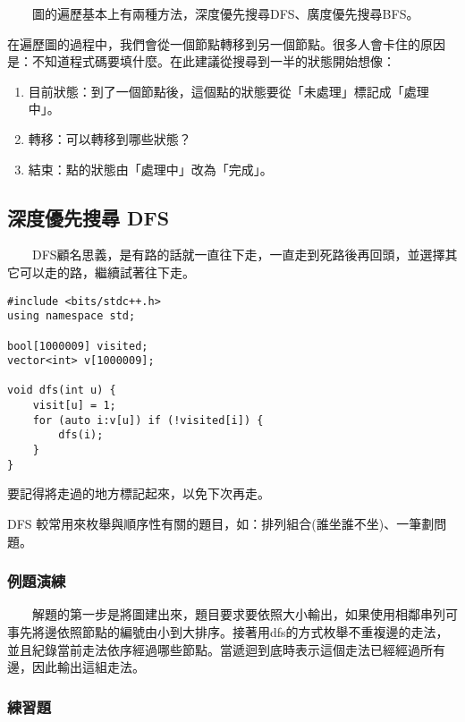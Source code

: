 　　圖的遍歷基本上有兩種方法，深度優先搜尋DFS、廣度優先搜尋BFS。

在遍歷圖的過程中，我們會從一個節點轉移到另一個節點。很多人會卡住的原因是：不知道程式碼要填什麼。在此建議從搜尋到一半的狀態開始想像：

\begin{enumerate}
\item 目前狀態：到了一個節點後，這個點的狀態要從「未處理」標記成「處理中」。
\item 轉移：可以轉移到哪些狀態？
\item 結束：點的狀態由「處理中」改為「完成」。
\end{enumerate}

\subsection{深度優先搜尋 DFS}

　　DFS顧名思義，是有路的話就一直往下走，一直走到死路後再回頭，並選擇其它可以走的路，繼續試著往下走。

\begin{lstlisting}[caption=DFS範例]
#include <bits/stdc++.h>
using namespace std;

bool[1000009] visited;
vector<int> v[1000009];

void dfs(int u) {
	visit[u] = 1;
	for (auto i:v[u]) if (!visited[i]) {
		dfs(i);
	}
}
\end{lstlisting}

要記得將走過的地方標記起來，以免下次再走。

DFS 較常用來枚舉與順序性有關的題目，如：排列組合(誰坐誰不坐)、一筆劃問題。

\subsubsection{例題演練}


　　解題的第一步是將圖建出來，題目要求要依照大小輸出，如果使用相鄰串列可事先將邊依照節點的編號由小到大排序。接著用dfs的方式枚舉不重複邊的走法，並且紀錄當前走法依序經過哪些節點。當遞迴到底時表示這個走法已經經過所有邊，因此輸出這組走法。

\subsubsection{練習題}

